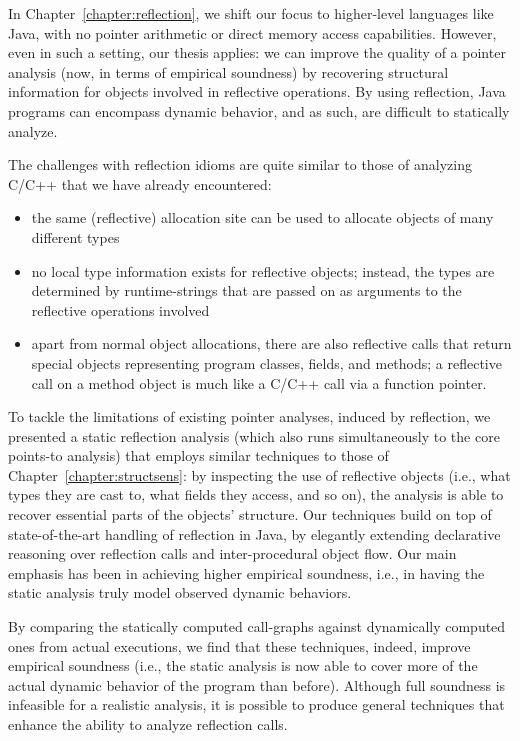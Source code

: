 In Chapter~\ref{chapter:reflection}, we shift our focus to
higher-level languages like Java, with no pointer arithmetic or direct
memory access capabilities. However, even in such a setting, our thesis
applies: we can improve the quality of a pointer analysis (now, in
terms of empirical soundness) by recovering structural information for
objects involved in reflective operations. By using reflection, Java
programs can encompass dynamic behavior, and as such, are difficult to
statically analyze.

The challenges with reflection idioms are quite similar to those of
analyzing C/C++ that we have already encountered:
\begin{itemize}[\(\cdot\)]
\item the same (reflective) allocation site can be used to allocate
  objects of many different types
\item no local type information exists for reflective objects;
  instead, the types are determined by runtime-strings that are passed
  on as arguments to the reflective operations involved
\item apart from normal object allocations, there are also reflective
  calls that return special objects representing program classes,
  fields, and methods; a reflective call on a method object is much
  like a C/C++ call via a function pointer.
\end{itemize}

To tackle the limitations of existing pointer analyses, induced by
reflection, we presented a static reflection analysis (which also runs
simultaneously to the core points-to analysis) that employs similar
techniques to those of Chapter~\ref{chapter:structsens}: by inspecting
the use of reflective objects (i.e., what types they are cast to, what
fields they access, and so on), the analysis is able to recover
essential parts of the objects' structure. Our techniques build on top
of state-of-the-art handling of reflection in Java, by elegantly
extending declarative reasoning over reflection calls and
inter-procedural object flow. Our main emphasis has been in achieving
higher empirical soundness, i.e., in having the static analysis truly
model observed dynamic behaviors.

By comparing the statically computed call-graphs against dynamically
computed ones from actual executions, we find that these techniques,
indeed, improve empirical soundness (i.e., the static analysis is now
able to cover more of the actual dynamic behavior of the program than
before). Although full soundness is infeasible for a realistic
analysis, it is possible to produce general techniques that enhance
the ability to analyze reflection calls.

